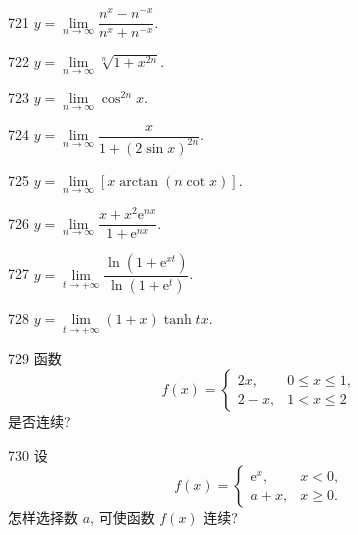\begin{prob}[M]{721}
$y = \lim\limits_{n \to \infty} \dfrac{n^x - n^{-x}}{n^x + n^{-x}}$.
\end{prob}

\begin{prob}[M]{722}
$y = \lim\limits_{n \to \infty} \sqrt[n]{1 + x^{2n}}$.
\end{prob}

\begin{prob}[M]{723}
$y = \lim\limits_{n \to \infty} \cos^{2n} x$.
\end{prob}

\begin{prob}[M]{724}
$y = \lim\limits_{n \to \infty} \dfrac{x}{1 + (2\sin x)^{2n}}$.
\end{prob}

\begin{prob}[M]{725}
$y = \lim\limits_{n \to \infty} [x \arctan(n \cot x)]$.
\end{prob}

\begin{prob}[M]{726}
$y = \lim\limits_{n \to \infty} \dfrac{x + x^2 \mathrm{e}^{nx}}{1 + \mathrm{e}^{nx}}$.
\end{prob}

\begin{prob}[M]{727}
$y = \lim\limits_{t \to +\infty} \dfrac{\ln(1 + \mathrm{e}^{xt})}{\ln(1 + \mathrm{e}^t)}$.
\end{prob}

\begin{prob}[M]{728}
$y = \lim\limits_{t \to +\infty} (1 + x)\tanh tx$.
\end{prob}

\begin{prob}[M]{729}
函数
\[
f(x) = \begin{cases}
2x, & 0 \leqslant x \leqslant 1, \\
2 - x, & 1 < x \leqslant 2
\end{cases}
\]
是否连续?
\end{prob}

\begin{prob}[M]{730}
设
\[
f(x) = \begin{cases}
\mathrm{e}^x, & x < 0, \\
a + x, & x \geqslant 0.
\end{cases}
\]
怎样选择数 $a$, 可使函数 $f(x)$ 连续?
\end{prob}

